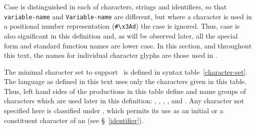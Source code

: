 \label{syntax}
%
\label{character-set}
%
\begin{optDefinition}
%
Case is distinguished in each of characters,
strings and identifiers, so that {\tt variable-name} and {\tt Variable-name} are
different, but where a character is used in a positional number representation
(\eg \verb+#\x3Ad+) the case is ignored.  Thus, case is also significant
in this definition and, as will be observed later, all the special form and
standard function names are lower case.  In this section, and throughout this
text, the names for individual character glyphs are those used in \cite{iso646}.

The minimal character set  to
support \eulisp\ is defined in syntax table~\ref{character-set}.  The language
as defined in this text uses only the characters given in this table.  Thus,
left hand sides of the productions in this table define and name groups of
characters which are used later in this definition: ,
, , ,
 and .  Any character not
specified here is classified under , which permits its
use as an initial or a constituent character of an  (see
\S~\ref{identifier}).
%
\Syntax
{}
%
\end{optDefinition}
